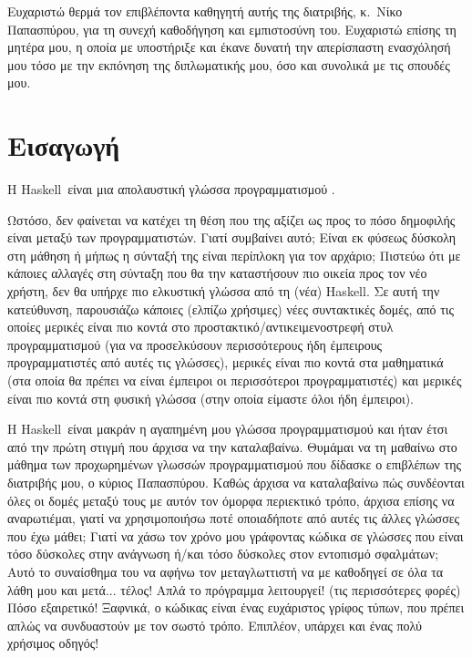 \documentclass[diploma]{softlab-thesis}
\def\H{Haskell}
\begin{document}

\begin{acknowledgementsgr}
  Ευχαριστώ θερμά τον επιβλέποντα καθηγητή αυτής της διατριβής,
  κ.~Νίκο Παπασπύρου, για τη συνεχή καθοδήγηση και εμπιστοσύνη
  του. Ευχαριστώ επίσης τη μητέρα μου, η οποία με
  υποστήριξε και έκανε δυνατή την απερίσπαστη ενασχόλησή μου τόσο
  με την εκπόνηση της διπλωματικής μου, όσο και συνολικά με τις
  σπουδές μου.
\end{acknowledgementsgr}


\tableofcontents
\listoftables



\mainmatter

\chapter{Εισαγωγή}

Η \H\ είναι μια απολαυστική γλώσσα προγραμματισμού \cite{marlow2010haskell}.

Ωστόσο, δεν φαίνεται να κατέχει τη θέση που της αξίζει ως προς το πόσο
δημοφιλής είναι μεταξύ των προγραμματιστών.
Γιατί συμβαίνει αυτό; Είναι εκ φύσεως δύσκολη στη
μάθηση ή μήπως η σύνταξή της είναι περίπλοκη για τον αρχάριο;
Πιστεύω ότι με κάποιες αλλαγές στη σύνταξη που θα την καταστήσουν πιο
οικεία προς τον νέο χρήστη,
δεν θα υπήρχε πιο ελκυστική γλώσσα από τη (νέα) \H.
Σε αυτή την κατεύθυνση, παρουσιάζω κάποιες (ελπίζω χρήσιμες) νέες
συντακτικές δομές, από τις οποίες μερικές είναι πιο κοντά στο
προστακτικό/αντικειμενοστρεφή στυλ προγραμματισμού
(για να προσελκύσουν περισσότερους ήδη
έμπειρους προγραμματιστές από αυτές τις γλώσσες), μερικές είναι πιο κοντά στα
μαθηματικά (στα οποία θα πρέπει να είναι έμπειροι οι περισσότεροι
προγραμματιστές) και μερικές είναι πιο κοντά στη φυσική γλώσσα (στην οποία
είμαστε όλοι ήδη έμπειροι).

Η \H\ είναι μακράν η αγαπημένη μου γλώσσα προγραμματισμού και ήταν έτσι
από την πρώτη στιγμή που άρχισα να την καταλαβαίνω.
Θυμάμαι να τη μαθαίνω στο μάθημα των προχωρημένων
γλωσσών προγραμματισμού που δίδασκε ο επιβλέπων της διατριβής μου, ο κύριος
Παπασπύρου. Καθώς άρχισα να καταλαβαίνω πώς συνδέονται όλες οι δομές
μεταξύ τους με αυτόν τον όμορφα περιεκτικό τρόπο, άρχισα επίσης να
αναρωτιέμαι, γιατί να χρησιμοποιήσω ποτέ οποιαδήποτε από αυτές τις άλλες
γλώσσες που έχω μάθει; Γιατί να χάσω τον χρόνο μου γράφοντας κώδικα σε
γλώσσες που είναι τόσο δύσκολες στην
ανάγνωση ή/και τόσο δύσκολες στον εντοπισμό σφαλμάτων;
Αυτό το συναίσθημα του να
αφήνω τον μεταγλωττιστή να με καθοδηγεί σε όλα τα λάθη μου και μετά... τέλος!
Απλά το πρόγραμμα λειτουργεί! (τις περισσότερες φορές) Πόσο εξαιρετικό!
Ξαφνικά, ο κώδικας
είναι ένας ευχάριστος γρίφος τύπων, που πρέπει απλώς να συνδυαστούν
με τον σωστό τρόπο. Επιπλέον, υπάρχει και ένας πολύ χρήσιμος οδηγός!
\end{document}
